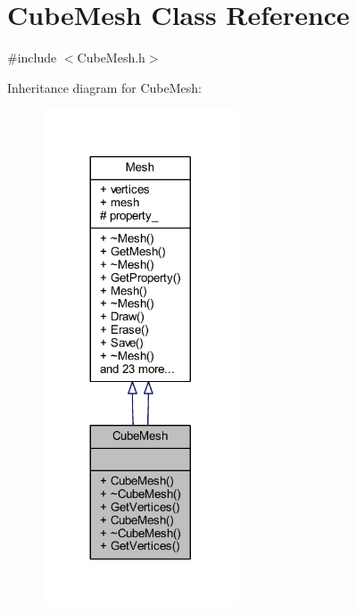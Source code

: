 \hypertarget{class_cube_mesh}{}\section{Cube\+Mesh Class Reference}
\label{class_cube_mesh}


{\ttfamily \#include $<$Cube\+Mesh.\+h$>$}



Inheritance diagram for Cube\+Mesh\+:
\nopagebreak
\begin{figure}[H]
\begin{center}
\leavevmode
\includegraphics[width=164pt]{class_cube_mesh__inherit__graph}
\end{center}
\end{figure}


